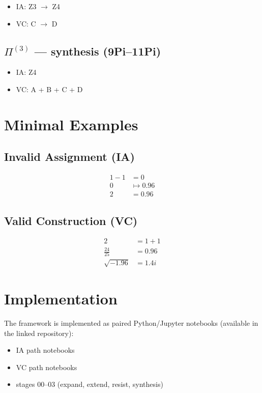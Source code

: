 \documentclass[11pt]{article}
\begin{document}
\begin{itemize}
\item IA: Z3 $\rightarrow$ Z4
\item VC: C $\rightarrow$ D
\end{itemize}

\subsection{$\Pi^{(3)}$ --- synthesis (9Pi--11Pi)}

\begin{itemize}
\item IA: Z4
\item VC: A + B + C + D
\end{itemize}

\section{Minimal Examples}

\subsection{Invalid Assignment (IA)}

\begin{align}
1 - 1 &= 0 \\[6pt]
0 &\mapsto 0.96 \\[6pt]
2 &= 0.96
\end{align}

\subsection{Valid Construction (VC)}

\begin{align}
2 &= 1 + 1 \\[6pt]
\frac{24}{25} &= 0.96 \\[6pt]
\sqrt{-1.96} &= 1.4i
\end{align}

\section{Implementation}

The framework is implemented as paired Python/Jupyter notebooks (available in the linked repository):

\begin{itemize}
\item IA path notebooks
\item VC path notebooks
\item stages 00--03 (expand, extend, resist, synthesis)
\end{itemize}
\end{document}
